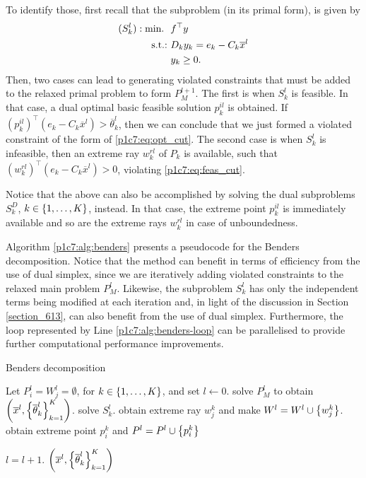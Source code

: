 To identify those, first recall that the subproblem (in its primal form), is given by
%
\begin{align*}
	(S_k^l): \mathop{\text{min.~}} \ & f^\top y \\
	\mathop{\text{s.t.:~}} & D_k y_k = e_k - C_k \overline{x}^l \\
	& y_k \geq 0.
\end{align*}
%
Then, two cases can lead to generating violated constraints that must be added to the relaxed primal problem to form $P_M^{l+1}$. The first is when $S_k^l$ is feasible. In that case, a dual optimal basic feasible solution $p^{il}_{k}$ is obtained. If $(p^{il}_k)^\top(e_k - C_k \overline{x}^l) > \overline{\theta}_k^l$, then we can conclude that we just formed a violated constraint of the form of \eqref{p1c7:eq:opt_cut}. The second case is when $S_k^l$ is infeasible, then an extreme ray $w^{rl}_k$ of $P_k$ is available, such that $(w^{rl}_k)^\top(e_k - C_k \overline{x}^l) > 0$, violating \eqref{p1c7:eq:feas_cut}. 

Notice that the above can also be accomplished by solving the dual subproblems $S^D_k$, $k \in \left\{ 1, \dots, K \right \}$, instead. In that case, the extreme point $p^{il}_k$ is immediately available and so are the extreme rays $w^{rl}_k$ in case of unboundedness.

Algorithm \ref{p1c7:alg:benders} presents a pseudocode for the Benders decomposition. Notice that the method can benefit in terms of efficiency from the use of dual simplex, since we are iteratively adding violated constraints to the relaxed main problem $P_M^l$. Likewise, the subproblem $S_k^l$ has only the independent terms being modified at each iteration and, in light of the discussion in Section \ref{section_613}, can also benefit from the use of dual simplex. Furthermore, the loop represented by Line \ref{p1c7:alg:benders-loop} can be parallelised to provide further computational performance improvements. 

\begin{algorithm}[H]
    \caption{Benders decomposition} \label{p1c7:alg:benders}
    \begin{algorithmic}[1] %
    Let $P_i^l = W_j^l = \emptyset$, for $k \in \left\{ 1,\dots,K \right \}$, and set
    $l \gets 0$. 
    \Repeat 
        \State solve $P_M^l$ to obtain $\left(\overline{x}^l, \left\{ \overline{\theta}_k^l \right \}_{k=1}^K\right)$. 
         \label{p1c7:alg:benders-loop}
            \State solve $S_k^l$.
            	\State obtain extreme ray $w_j^k$ and make $W^l = W^l \cup \left\{ w_j^k \right \}$.
            \Else
            	\State obtain extreme point $p_i^k$ and $P^l = P^l \cup \left\{ p_i^k \right \}$
            \EndIf  
        \EndFor
 
        \State $l = l + 1$.        	
     $\left(\overline{x}^l, \left\{ \overline{\theta}_k^l \right \}_{k=1}^K\right)$
  \end{algorithmic}
\end{algorithm}

